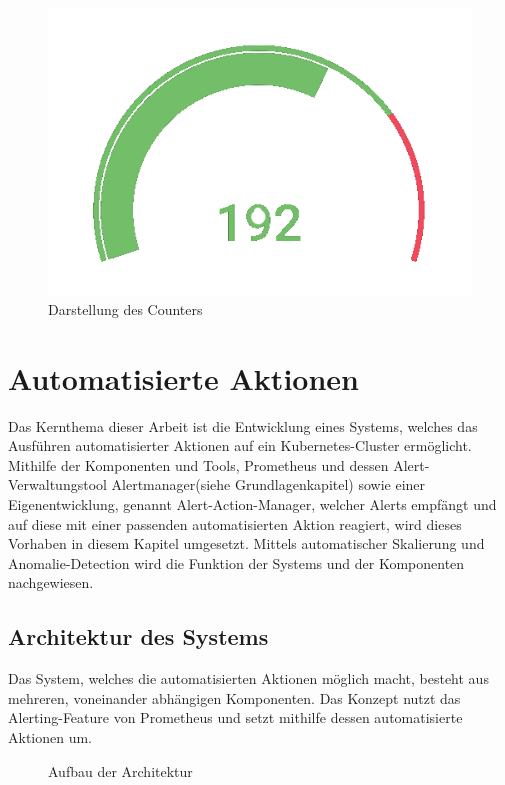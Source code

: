 \documentclass[a4paper,10pt]{scrartcl}
\begin{document}
\begin{figure}[htbp]
\includegraphics[scale=.8]{img/PercantageTransparent.png}
\caption{Darstellung des Counters}
\end{figure}


\section{Automatisierte Aktionen}

Das Kernthema dieser Arbeit ist die Entwicklung eines Systems, welches das Ausführen automatisierter Aktionen auf ein Kubernetes-Cluster ermöglicht. Mithilfe der Komponenten und Tools, Prometheus und dessen Alert-Verwaltungstool \glqq Alertmanager\grqq (siehe Grundlagenkapitel) sowie einer Eigenentwicklung, genannt \glqq Alert-Action-Manager\grqq, welcher Alerts empfängt und auf diese mit einer passenden automatisierten Aktion reagiert, wird dieses Vorhaben in diesem Kapitel umgesetzt. Mittels automatischer Skalierung und Anomalie-Detection wird die Funktion der Systems und der Komponenten nachgewiesen.


\pagebreak
\subsection{Architektur des Systems}

Das System, welches die automatisierten Aktionen möglich macht, besteht aus mehreren, voneinander abhängigen Komponenten. Das Konzept nutzt das Alerting-Feature von Prometheus und setzt mithilfe dessen automatisierte Aktionen um.\\

\begin{figure}[htbp]
  \centering
  \scalebox{.6}{}
  \caption{Aufbau der Architektur}
\end{figure}
\end{document}
